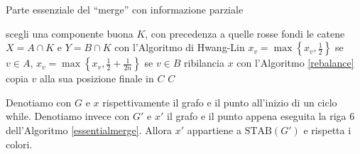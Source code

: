 \begin{algorithm}
	\caption{Parte essenziale del ``merge'' con informazione parziale} \label{essentialmerge} 
	\begin{algorithmic}
		[1]  \STATE scegli una componente buona \(K\), con precedenza a quelle rosse \STATE fondi le catene \(X=A\cap K\) e \(Y=B\cap K\) con l'Algoritmo di Hwang-Lin  \STATE \(x_v=\max{\left\{x_v, \frac{1}{2}\right\}}\) se \(v\in A\), \(x_v=\max{\left\{x_v, \frac{1}{2}+\frac{1}{2n}\right\}}\) se \(v\in B\) \ENDFOR \STATE ribilancia \(x\) con l'Algoritmo \ref{rebalance}   \STATE copia \(v\) alla sua posizione finale in \(C\) \ENDIF \ENDFOR \ENDWHILE \RETURN \(C\) 
	\end{algorithmic}
\end{algorithm}
\begin{lemma}
	\label{evolutionlemma} Denotiamo con \(G\) e \(x\) rispettivamente il grafo e il punto all'inizio di un ciclo while. Denotiamo invece con \(G'\) e \(x'\) il grafo e il punto appena eseguita la riga \(6\) dell'Algoritmo \ref{essentialmerge}. Allora \(x'\) appartiene a \(\text{STAB}(G')\) e rispetta i colori. 
\end{lemma}

